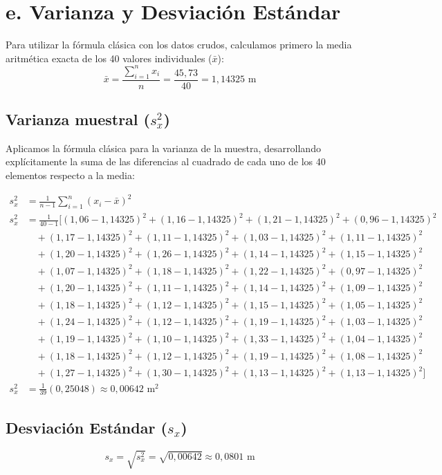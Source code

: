 \documentclass[12pt, a4paper]{article}
\begin{document}
\section*{e. Varianza y Desviación Estándar}
Para utilizar la fórmula clásica con los datos crudos, calculamos primero la media aritmética exacta de los 40 valores individuales ($\bar{x}$):
\[ \bar{x} = \frac{\sum_{i=1}^{n} x_i}{n} = \frac{45,73}{40} = 1,14325 \text{ m} \]

\subsection*{Varianza muestral ($s_x^2$)}
Aplicamos la fórmula clásica para la varianza de la muestra, desarrollando explícitamente la suma de las diferencias al cuadrado de cada uno de los 40 elementos respecto a la media:

\begin{align*}
s_x^2 &= \frac{1}{n - 1} \sum_{i=1}^{n} (x_i - \bar{x})^2 \\
s_x^2 &= \frac{1}{40 - 1} \Big[ (1,06 - 1,14325)^2 + (1,16 - 1,14325)^2 + (1,21 - 1,14325)^2 + (0,96 - 1,14325)^2 \\
&\quad + (1,17 - 1,14325)^2 + (1,11 - 1,14325)^2 + (1,03 - 1,14325)^2 + (1,11 - 1,14325)^2 \\
&\quad + (1,20 - 1,14325)^2 + (1,26 - 1,14325)^2 + (1,14 - 1,14325)^2 + (1,15 - 1,14325)^2 \\
&\quad + (1,07 - 1,14325)^2 + (1,18 - 1,14325)^2 + (1,22 - 1,14325)^2 + (0,97 - 1,14325)^2 \\
&\quad + (1,20 - 1,14325)^2 + (1,11 - 1,14325)^2 + (1,14 - 1,14325)^2 + (1,09 - 1,14325)^2 \\
&\quad + (1,18 - 1,14325)^2 + (1,12 - 1,14325)^2 + (1,15 - 1,14325)^2 + (1,05 - 1,14325)^2 \\
&\quad + (1,24 - 1,14325)^2 + (1,12 - 1,14325)^2 + (1,19 - 1,14325)^2 + (1,03 - 1,14325)^2 \\
&\quad + (1,19 - 1,14325)^2 + (1,10 - 1,14325)^2 + (1,33 - 1,14325)^2 + (1,04 - 1,14325)^2 \\
&\quad + (1,18 - 1,14325)^2 + (1,12 - 1,14325)^2 + (1,19 - 1,14325)^2 + (1,08 - 1,14325)^2 \\
&\quad + (1,27 - 1,14325)^2 + (1,30 - 1,14325)^2 + (1,13 - 1,14325)^2 + (1,13 - 1,14325)^2 \Big] \\
s_x^2 &= \frac{1}{39} (0,25048) \approx 0,00642 \text{ m}^2
\end{align*}

\subsection*{Desviación Estándar ($s_x$)}
\[ s_x = \sqrt{s_x^2} = \sqrt{0,00642} \approx 0,0801 \text{ m} \]
\end{document}
